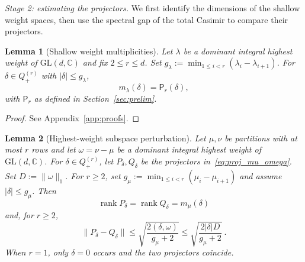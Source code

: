 \documentclass[a4paper,onecolumn,11pt]{quantumarticle}
\newtheorem{lem}{Lemma}
\begin{document}
\emph{Stage 2: estimating the projectors.} We first identify the
dimensions of the shallow weight spaces, then use the spectral gap of
the total Casimir to compare their projectors.

\begin{lem}[Shallow weight multiplicities]\label{lem:shallow_multiplicities}
Let $\lambda$ be a dominant integral highest weight of
$\mathrm{GL}(d,\mathbb C)$ and fix $2\le r\le d$. Set
$g_\lambda:=\min_{1\le i<r}(\lambda_i-\lambda_{i+1})$.
For $\delta\in Q_+^{(r)}$ with $|\delta|\le g_\lambda$,
\[
m_\lambda(\delta)=\mathsf P_r(\delta),
\]
with $\mathsf P_r$ as defined in Section~\ref{sec:prelim}.
\end{lem}

\begin{proof}
See Appendix~\ref{app:proofs}.
\end{proof}

\begin{lem}[Highest-weight subspace perturbation]\label{lem:perturbation}
Let $\mu,\nu$ be partitions with at most $r$ rows and let
$\omega=\nu-\mu$ be a dominant integral highest weight of
$\mathrm{GL}(d,\mathbb C)$.
For $\delta\in Q_+^{(r)}$, let $P_\delta,Q_\delta$ be
the projectors in~\eqref{eq:proj_mu_omega}.
Set $D:=\|\omega\|_1$. For $r\ge2$, set
$g_\mu:=\min_{1\le i<r}(\mu_i-\mu_{i+1})$ and assume
$|\delta|\le g_\mu$. Then
\[
\operatorname{rank}P_\delta
=\operatorname{rank}Q_\delta
=m_\mu(\delta)
\]
and, for $r\ge2$,
\begin{equation}\label{eq:projector_casimir_bound}
    \|P_\delta-Q_\delta\|
    \le\sqrt{\frac{2(\delta,\omega)}{g_\mu+2}}
    \le\sqrt{\frac{2|\delta|D}{g_\mu+2}}\ .
\end{equation}
When $r=1$, only $\delta=0$ occurs and the two projectors coincide.
\end{lem}
\end{document}
